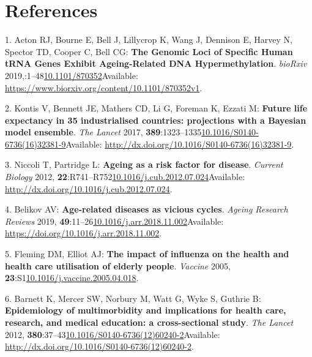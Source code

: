 \documentclass[
]{book}
\begin{document}
\hypertarget{references}{%
\chapter*{References}\label{references}}

\hypertarget{refs}{}
\leavevmode\hypertarget{ref-Acton2020}{}%
1. Acton RJ, Bourne E, Bell J, Lillycrop K, Wang J, Dennison E, Harvey N, Spector TD, Cooper C, Bell CG: \textbf{The Genomic Loci of Specific Human tRNA Genes Exhibit Ageing-Related DNA Hypermethylation}. \emph{bioRxiv} 2019,:1--48\href{https://doi.org/10.1101/870352}{10.1101/870352}Available: \url{https://www.biorxiv.org/content/10.1101/870352v1}.

\leavevmode\hypertarget{ref-Kontis2017}{}%
2. Kontis V, Bennett JE, Mathers CD, Li G, Foreman K, Ezzati M: \textbf{Future life expectancy in 35 industrialised countries: projections with a Bayesian model ensemble}. \emph{The Lancet} 2017, \textbf{389}:1323--1335\href{https://doi.org/10.1016/S0140-6736(16)32381-9}{10.1016/S0140-6736(16)32381-9}Available: \url{http://dx.doi.org/10.1016/S0140-6736(16)32381-9}.

\leavevmode\hypertarget{ref-Niccoli2012}{}%
3. Niccoli T, Partridge L: \textbf{Ageing as a risk factor for disease}. \emph{Current Biology} 2012, \textbf{22}:R741--R752\href{https://doi.org/10.1016/j.cub.2012.07.024}{10.1016/j.cub.2012.07.024}Available: \url{http://dx.doi.org/10.1016/j.cub.2012.07.024}.

\leavevmode\hypertarget{ref-Belikov2019}{}%
4. Belikov AV: \textbf{Age-related diseases as vicious cycles}. \emph{Ageing Research Reviews} 2019, \textbf{49}:11--26\href{https://doi.org/10.1016/j.arr.2018.11.002}{10.1016/j.arr.2018.11.002}Available: \url{https://doi.org/10.1016/j.arr.2018.11.002}.

\leavevmode\hypertarget{ref-Fleming2005}{}%
5. Fleming DM, Elliot AJ: \textbf{The impact of influenza on the health and health care utilisation of elderly people}. \emph{Vaccine} 2005, \textbf{23}:S1\href{https://doi.org/10.1016/j.vaccine.2005.04.018}{10.1016/j.vaccine.2005.04.018}.

\leavevmode\hypertarget{ref-Barnett2012}{}%
6. Barnett K, Mercer SW, Norbury M, Watt G, Wyke S, Guthrie B: \textbf{Epidemiology of multimorbidity and implications for health care, research, and medical education: a cross-sectional study}. \emph{The Lancet} 2012, \textbf{380}:37--43\href{https://doi.org/10.1016/S0140-6736(12)60240-2}{10.1016/S0140-6736(12)60240-2}Available: \url{http://dx.doi.org/10.1016/S0140-6736(12)60240-2}.
\end{document}
